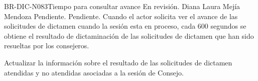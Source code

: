 \begin{BusinessRule}{BR-DIC-N083}{Tiempo para consultar avance }
	{\bcCondition} %
	{\btTimer}     %
	{\blInfluencing}     %
	\BRItem[Estado] En revisión.
	 Diana Laura Mejía Mendoza
	 Pendiente.
	 Pendiente.
	\BRItem[Descripción] Cuando el actor solicita ver el avance de las solicitudes de dictamen cuando la sesión esta en proceso, cada  600 segundos se obtiene el resultado de dictaminación de las solicitudes de dictamen que han sido resueltas por los consejeros.
	\BRItem[Sentencia] \cdtEmpty
	
%	
	\BRItem[Motivación] Actualizar la información sobre el resultado de las solicitudes de dictamen atendidas y no atendidas asociadas a la sesión de Consejo.
\end{BusinessRule}

